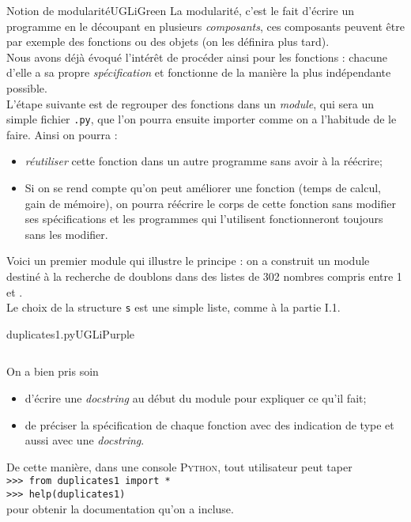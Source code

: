 \documentclass[a4paper,10pt,cours]{nsi}
\begin{document}
\begin{encadrecolore}{Notion de modularité}{UGLiGreen}
    La modularité, c'est le fait d'écrire un programme en le découpant en plusieurs \textit{composants}, ces composants peuvent être par exemple des fonctions ou des objets (on les définira plus tard).\\
    Nous avons déjà évoqué l'intérêt de procéder ainsi pour les fonctions : chacune d'elle a sa propre \textit{spécification} et fonctionne de la manière la plus indépendante possible.\\
    
    L'étape suivante est de regrouper des fonctions dans un \textit{module}, qui sera un simple fichier \texttt{.py}, que l'on pourra ensuite importer comme on a l'habitude de le faire.
    Ainsi on pourra :
    \begin{itemize}
        \item 	\textit{réutiliser} cette fonction dans un autre programme sans avoir à la réécrire;
        \item 	Si on se rend compte qu'on peut améliorer une fonction (temps de calcul, gain de mémoire), on pourra réécrire le corps de cette fonction sans modifier ses spécifications et les programmes qui l'utilisent fonctionneront toujours sans les modifier.
    \end{itemize}
\end{encadrecolore}

Voici un premier module qui illustre le principe : on a construit un module destiné à la recherche de doublons dans des listes de 302 nombres compris entre 1 et .\\
Le choix de la structure \texttt{s} est une simple liste, comme à la partie \textsc{I}.1.

\begin{encadrecolore}{duplicates1.py}{UGLiPurple}
    \inputminted{python}{scripts/duplicates1.py}
\end{encadrecolore}

\begin{remarque}[]
    On a bien pris soin
    \begin{itemize}
        \item 	d'écrire une \textit{docstring} au début du module pour expliquer ce qu'il fait;
        \item 	de préciser la spécification de chaque fonction avec des indication de type et aussi avec une \textit{docstring}.
    \end{itemize}
    De cette manière, dans une console \textsc{Python}, tout utilisateur peut taper\\
    \texttt{>>>  from duplicates1 import *}\\
    \texttt{>>>  help(duplicates1)}\\
    pour obtenir la documentation qu'on a incluse.
\end{remarque}
\end{document}
